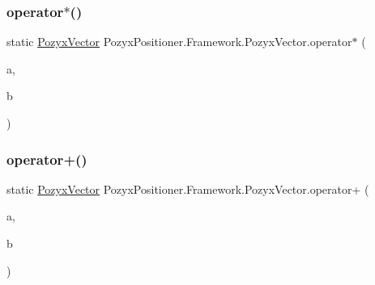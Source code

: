 \subsubsection{\texorpdfstring{operator$\ast$()}{operator*()}\hspace{0.1cm}{\footnotesize\ttfamily [2/2]}}
{\footnotesize\ttfamily static \hyperlink{struct_pozyx_positioner_1_1_framework_1_1_pozyx_vector}{Pozyx\+Vector} Pozyx\+Positioner.\+Framework.\+Pozyx\+Vector.\+operator$\ast$ (\begin{DoxyParamCaption}\item[{\hyperlink{struct_pozyx_positioner_1_1_framework_1_1_pozyx_vector}{Pozyx\+Vector}}]{a,  }\item[{float}]{b }\end{DoxyParamCaption})\hspace{0.3cm}{\ttfamily [static]}}

\mbox{\label{struct_pozyx_positioner_1_1_framework_1_1_pozyx_vector_a73cfc38b2123d1e4dcdd0f9db765c323}} 
\subsubsection{\texorpdfstring{operator+()}{operator+()}}
{\footnotesize\ttfamily static \hyperlink{struct_pozyx_positioner_1_1_framework_1_1_pozyx_vector}{Pozyx\+Vector} Pozyx\+Positioner.\+Framework.\+Pozyx\+Vector.\+operator+ (\begin{DoxyParamCaption}\item[{\hyperlink{struct_pozyx_positioner_1_1_framework_1_1_pozyx_vector}{Pozyx\+Vector}}]{a,  }\item[{\hyperlink{struct_pozyx_positioner_1_1_framework_1_1_pozyx_vector}{Pozyx\+Vector}}]{b }\end{DoxyParamCaption})\hspace{0.3cm}{\ttfamily [static]}}

\mbox{\label{struct_pozyx_positioner_1_1_framework_1_1_pozyx_vector_a9f63bedfcb7c16b174e4a7fdae7dc80b}} 
